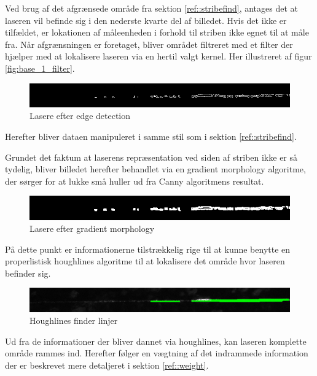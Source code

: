 Ved brug af det afgrænsede område fra sektion \ref{ref::stribefind}, antages det at laseren vil befinde sig i den nederste kvarte del af billedet. Hvis det ikke er tilfældet, er lokationen af måleenheden i forhold til striben ikke egnet til at måle fra.
Når afgrænsningen er foretaget, bliver området filtreret med et filter der hjælper med at lokalisere laseren via en hertil valgt kernel. Her illustreret af figur \ref{fig:base_1_filter}.

\begin{figure}[h]
	\centering
	\includegraphics[width=0.7\linewidth]{Billeder/base_2_canny}
	\caption{Lasere efter edge detection}
	\label{fig:base_2_canny}
\end{figure}

Herefter bliver dataen manipuleret i samme stil som i sektion \ref{ref::stribefind}.

Grundet det faktum at laserens repræsentation ved siden af striben ikke er så tydelig, bliver billedet herefter behandlet via en gradient morphology algoritme, der sørger for at lukke små huller ud fra Canny algoritmens resultat.

\begin{figure}[h]
	\centering
	\includegraphics[width=0.7\linewidth]{Billeder/base_3_morph}
	\caption{Lasere efter gradient morphology}
	\label{fig:base_3_morph}
\end{figure}

På dette punkt er informationerne tilstrækkelig rige til at kunne benytte en properlistisk houghlines algoritme til at lokalisere det område hvor laseren befinder sig.

\begin{figure}[h!]
	\centering
	\includegraphics[width=0.7\linewidth]{Billeder/base_4_houghP}
	\caption{Houghlines finder linjer}
	\label{fig:base_4_hough}
\end{figure}

Ud fra de informationer der bliver dannet via houghlines, kan laseren komplette område rammes ind. Herefter følger en vægtning af det indrammede information der er beskrevet mere detaljeret i sektion \ref{ref::weight}.

